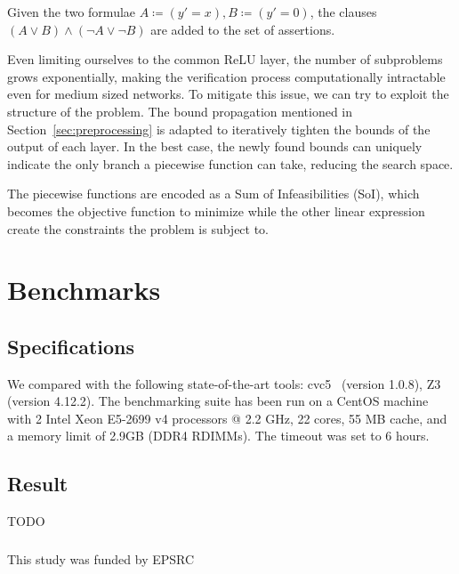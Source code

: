 \documentclass[runningheads]{llncs}
\begin{document}
Given the two formulae $A \coloneqq (y' = x), B \coloneqq (y' = 0)$, the clauses $(A \lor B) \land (\neg A \lor \neg B)$ are added to the set of assertions.

Even limiting ourselves to the common ReLU layer, the number of subproblems grows exponentially, making the verification process computationally intractable even for medium sized networks.
To mitigate this issue, we can try to exploit the structure of the problem.
The bound propagation mentioned in Section~\ref{sec:preprocessing} is adapted to iteratively tighten the bounds of the output of each layer.
In the best case, the newly found bounds can uniquely indicate the only branch a piecewise function can take, reducing the search space.

The piecewise functions are encoded as a Sum of Infeasibilities (SoI), which becomes the objective function to minimize while the other linear expression create the constraints the problem is subject to.


\section{Benchmarks}
\label{sec:benchmarks}
\subsection*{Specifications}

We compared \dlinear with the following state-of-the-art tools: cvc5~\cite{ref:cvc5} (version 1.0.8), Z3~\cite{ref:z3} (version 4.12.2).
The benchmarking suite has been run on a CentOS machine with 2 Intel Xeon E5-2699 v4 processors @ 2.2 GHz, 22 cores, 55 MB cache, and a memory limit of 2.9GB (DDR4 RDIMMs).
The timeout was set to 6 hours.

\subsection*{Result}

TODO

\begin{credits}
    \subsubsection{\ackname} This study was funded by EPSRC
\end{credits}



\end{document}
